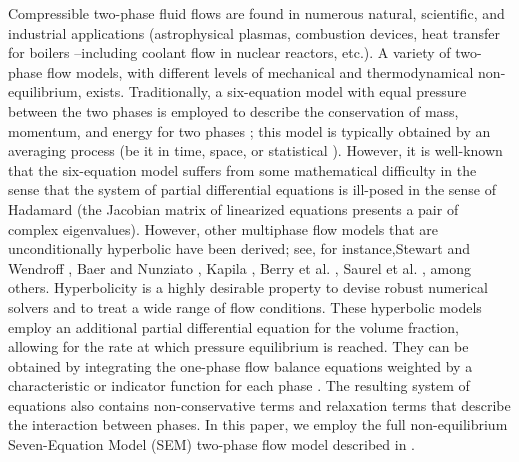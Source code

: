 \documentclass[preprint,10pt]{elsarticle}
\begin{document}
Compressible two-phase fluid flows are found in numerous natural, scientific, and industrial applications (astrophysical plasmas, 
combustion devices, heat transfer for boilers --including coolant flow in nuclear reactors, etc.). 
A variety of two-phase flow models, with different levels of mechanical and thermodynamical non-equilibrium, exists. 
Traditionally, a six-equation model with equal pressure between the two phases is employed to describe the conservation of mass, 
momentum, and energy for two phases \cite{Stadtke}; this model is typically obtained by an averaging process (be it in time, space,
or statistical \cite{BruceStewart1984363}). However, it is well-known that the six-equation model 
suffers from some mathematical difficulty in the sense that the system of partial differential equations is ill-posed in the sense of Hadamard 
(the Jacobian matrix of linearized equations presents a pair of complex eigenvalues). 
However, other multiphase flow models that are unconditionally hyperbolic have been derived; see, for instance,Stewart and Wendroff \cite{BruceStewart1984363}, 
Baer and Nunziato \cite{BaerNunziato}, Kapila \cite{Kapila_2001,Berry_NED2010}, Berry et al. \cite{Berry_1985}, Saurel et al. \cite{Saurel_2001a,Saurel_2001b}, 
among others. Hyperbolicity is a highly desirable property to devise robust numerical solvers and to treat a wide range of flow conditions.
These hyperbolic models employ an additional partial differential equation for the volume fraction, allowing for the rate at 
which pressure equilibrium is reached.  They can be obtained by integrating the one-phase flow balance equations weighted by a characteristic 
or indicator function for each phase \cite{DrewPassman}. The resulting system of equations also contains non-conservative terms and relaxation terms that 
describe the interaction between phases. In this paper, we employ the full non-equilibrium Seven-Equation Model 
(SEM) two-phase flow model described in \cite{Berry_1985,BaerNunziato,Saurel_2001b,Berry_NED2010}.
\end{document}
